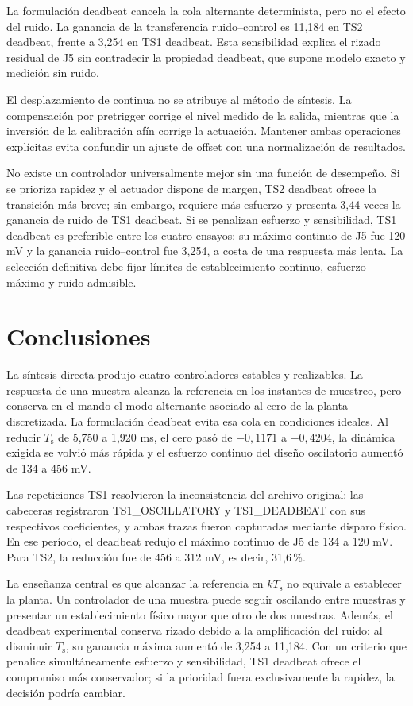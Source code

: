 \documentclass[10pt,twocolumn]{article}
\newcommand{\Ts}{T_{\mathrm{s}}}
\begin{document}
La formulación deadbeat cancela la cola alternante determinista, pero no el efecto del ruido. La ganancia de la transferencia ruido--control es 11,184 en TS2 deadbeat, frente a 3,254 en TS1 deadbeat. Esta sensibilidad explica el rizado residual de J5 sin contradecir la propiedad deadbeat, que supone modelo exacto y medición sin ruido.

El desplazamiento de continua no se atribuye al método de síntesis. La compensación por pretrigger corrige el nivel medido de la salida, mientras que la inversión de la calibración afín corrige la actuación. Mantener ambas operaciones explícitas evita confundir un ajuste de offset con una normalización de resultados.

No existe un controlador universalmente mejor sin una función de desempeño. Si se prioriza rapidez y el actuador dispone de margen, TS2 deadbeat ofrece la transición más breve; sin embargo, requiere más esfuerzo y presenta 3,44 veces la ganancia de ruido de TS1 deadbeat. Si se penalizan esfuerzo y sensibilidad, TS1 deadbeat es preferible entre los cuatro ensayos: su máximo continuo de J5 fue 120 mV y la ganancia ruido--control fue 3,254, a costa de una respuesta más lenta. La selección definitiva debe fijar límites de establecimiento continuo, esfuerzo máximo y ruido admisible.

\section{Conclusiones}
La síntesis directa produjo cuatro controladores estables y realizables. La respuesta de una muestra alcanza la referencia en los instantes de muestreo, pero conserva en el mando el modo alternante asociado al cero de la planta discretizada. La formulación deadbeat evita esa cola en condiciones ideales. Al reducir \(\Ts\) de 5,750 a 1,920 ms, el cero pasó de \(-0,1171\) a \(-0,4204\), la dinámica exigida se volvió más rápida y el esfuerzo continuo del diseño oscilatorio aumentó de 134 a 456 mV.

Las repeticiones TS1 resolvieron la inconsistencia del archivo original: las cabeceras registraron TS1\_OSCILLATORY y TS1\_DEADBEAT con sus respectivos coeficientes, y ambas trazas fueron capturadas mediante disparo físico. En ese período, el deadbeat redujo el máximo continuo de J5 de 134 a 120 mV. Para TS2, la reducción fue de 456 a 312 mV, es decir, 31,6\,\%.

La enseñanza central es que alcanzar la referencia en \(k\Ts\) no equivale a establecer la planta. Un controlador de una muestra puede seguir oscilando entre muestras y presentar un establecimiento físico mayor que otro de dos muestras. Además, el deadbeat experimental conserva rizado debido a la amplificación del ruido: al disminuir \(\Ts\), su ganancia máxima aumentó de 3,254 a 11,184. Con un criterio que penalice simultáneamente esfuerzo y sensibilidad, TS1 deadbeat ofrece el compromiso más conservador; si la prioridad fuera exclusivamente la rapidez, la decisión podría cambiar.
\end{document}
